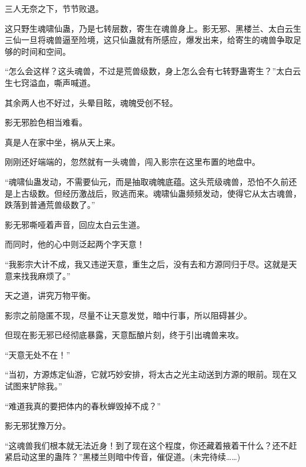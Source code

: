 \begin{this_body}
三人无奈之下，节节败退。

这只野生魂啸仙蛊，乃是七转层数，寄生在魂兽身上。影无邪、黑楼兰、太白云生三仙一旦将魂兽逼至险境，这只仙蛊就有所感应，爆发出来，给寄生的魂兽争取足够的时间和空间。

“怎么会这样？这头魂兽，不过是荒兽级数，身上怎么会有七转野蛊寄生？”太白云生七窍溢血，嘶声喊道。

其余两人也不好过，头晕目眩，魂魄受创不轻。

影无邪脸色相当难看。

真是人在家中坐，祸从天上来。

刚刚还好端端的，忽然就有一头魂兽，闯入影宗在这里布置的地盘中。

“魂啸仙蛊发动，不需要仙元，而是抽取魂魄底蕴。这头荒级魂兽，恐怕不久前还是上古级数。但经历激战后，败逃而来。魂啸仙蛊频频发动，使得它从太古魂兽，跌落到普通荒兽级数了。”

影无邪嘶哑着声音，回应太白云生道。

而同时，他的心中则泛起两个字天意！

“我影宗大计不成，我又违逆天意，重生之后，没有去和方源同归于尽。这就是天意来找我麻烦了。”

天之道，讲究万物平衡。

影宗之前隐匿不现，尽量不让天意发觉，暗中行事，所以阻碍甚少。

但现在影无邪已经彻底暴露，天意酝酿片刻，终于引出魂兽来攻。

“天意无处不在！”

“当初，方源炼定仙游，它就巧妙安排，将太古之光主动送到方源的眼前。现在又试图来铲除我。”

“难道我真的要把体内的春秋蝉毁掉不成？”

影无邪犹豫万分。

“这魂兽我们根本就无法近身！到了现在这个程度，你还藏着掖着干什么？还不赶紧启动这里的蛊阵？”黑楼兰则暗中传音，催促道。(未完待续……)

\end{this_body}


